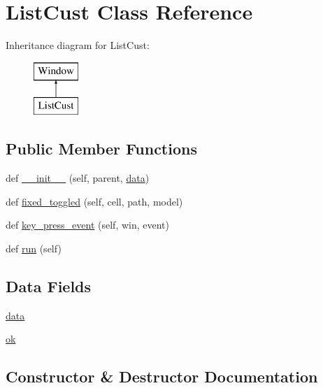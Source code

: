 \hypertarget{classcustselect_1_1_list_cust}{}\section{List\+Cust Class Reference}
\label{classcustselect_1_1_list_cust}
Inheritance diagram for List\+Cust\+:\begin{figure}[H]
\begin{center}
\leavevmode
\includegraphics[height=2.000000cm]{classcustselect_1_1_list_cust}
\end{center}
\end{figure}
\subsection*{Public Member Functions}
\begin{DoxyCompactItemize}
\item 
def \hyperlink{classcustselect_1_1_list_cust_aeb833639525321c9d011dce1184c5d36}{\+\_\+\+\_\+init\+\_\+\+\_\+} (self, parent, \hyperlink{classcustselect_1_1_list_cust_a511ae0b1c13f95e5f08f1a0dd3da3d93}{data})
\item 
def \hyperlink{classcustselect_1_1_list_cust_a9e131589c1f888e8c69cc0a45796b78b}{fixed\+\_\+toggled} (self, cell, path, model)
\item 
def \hyperlink{classcustselect_1_1_list_cust_ade844b0d29257631707c9cf4374d65b2}{key\+\_\+press\+\_\+event} (self, win, event)
\item 
def \hyperlink{classcustselect_1_1_list_cust_ad22709b2e67308af35f55680d5a026e0}{run} (self)
\end{DoxyCompactItemize}
\subsection*{Data Fields}
\begin{DoxyCompactItemize}
\item 
\hyperlink{classcustselect_1_1_list_cust_a511ae0b1c13f95e5f08f1a0dd3da3d93}{data}
\item 
\hyperlink{classcustselect_1_1_list_cust_ab73fdaa1fb7669da760b49600c45d9be}{ok}
\end{DoxyCompactItemize}


\subsection{Constructor \& Destructor Documentation}
\mbox{\label{classcustselect_1_1_list_cust_aeb833639525321c9d011dce1184c5d36}} 
